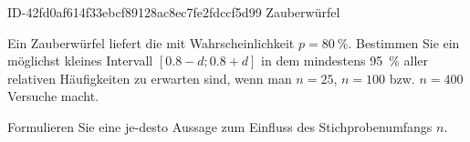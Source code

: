 \begin{exercise}
      {ID-42fd0af614f33ebcf89128ac8ec7fe2fdccf5d99}
      {Zauberwürfel}
  \ifproblem\problem\par
    Ein Zauberwürfel liefert die \grqq{} mit
    Wahrscheinlichkeit $p=\SI{80}{\percent}$.
    Bestimmen Sie ein möglichst kleines Intervall
    $[\num{0.8}-d;\num{0.8}+d]$ in dem mindestens
    \SI{95}{\percent} aller relativen Häufigkeiten
    zu erwarten sind, wenn man $n=\num{25}$,
    $n=\num{100}$ bzw. $n=\num{400}$ Versuche macht.
    \par
    Formulieren Sie eine \glqq je-desto Aussage\grqq{}
    zum Einfluss des Stichprobenumfangs $n$.
  \fi
\end{exercise}
